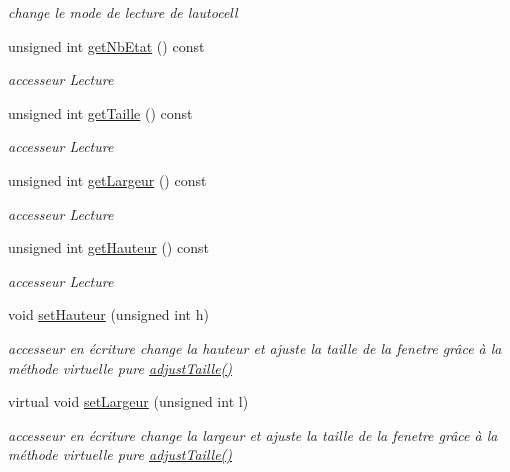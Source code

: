 \begin{DoxyCompactItemize}
\begin{DoxyCompactList}\small\item\em change le mode de lecture de l\textquotesingle{}autocell \end{DoxyCompactList}\item 
unsigned int \hyperlink{class_autocell_a342d76cd9ff9ee3b9942a7917c12a435}{get\+Nb\+Etat} () const 
\begin{DoxyCompactList}\small\item\em accesseur Lecture \end{DoxyCompactList}\item 
unsigned int \hyperlink{class_autocell_af4649cfcee8d1eb6250de48110d2dda0}{get\+Taille} () const 
\begin{DoxyCompactList}\small\item\em accesseur Lecture \end{DoxyCompactList}\item 
unsigned int \hyperlink{class_autocell_af95bce9bd555eee6e38752a639265799}{get\+Largeur} () const 
\begin{DoxyCompactList}\small\item\em accesseur Lecture \end{DoxyCompactList}\item 
unsigned int \hyperlink{class_autocell_a6211b452c915737d2165dc7aeb7c31ba}{get\+Hauteur} () const 
\begin{DoxyCompactList}\small\item\em accesseur Lecture \end{DoxyCompactList}\item 
void \hyperlink{class_autocell_a8644ce5042e0849ebe0b0f045eed18a0}{set\+Hauteur} (unsigned int h)
\begin{DoxyCompactList}\small\item\em accesseur en écriture change la hauteur et ajuste la taille de la fenetre grâce à la méthode virtuelle pure \hyperlink{class_autocell_a060d956fa55ae3871081b3ecb949689f}{adjust\+Taille()} \end{DoxyCompactList}\item 
virtual void \hyperlink{class_autocell_a73af052faee8acf25c6f91aba3493004}{set\+Largeur} (unsigned int l)
\begin{DoxyCompactList}\small\item\em accesseur en écriture change la largeur et ajuste la taille de la fenetre grâce à la méthode virtuelle pure \hyperlink{class_autocell_a060d956fa55ae3871081b3ecb949689f}{adjust\+Taille()} \end{DoxyCompactList}\item 

\end{DoxyCompactItemize}
